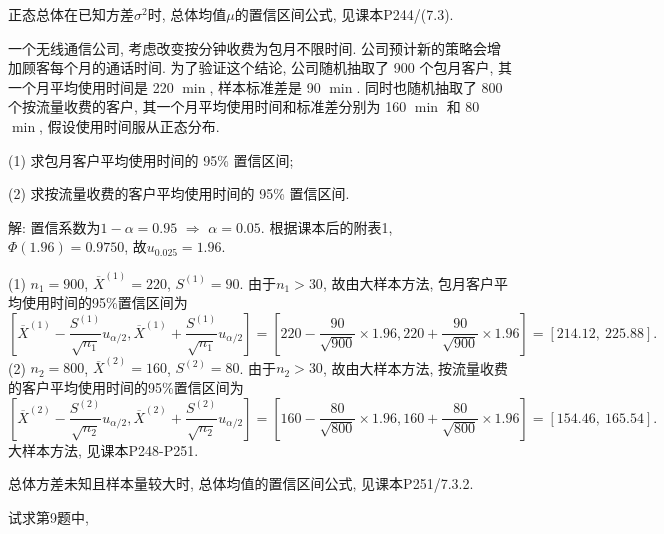 \documentclass[standard]{ExBook}
\renewenvironment{shaded}{%
  \def\FrameCommand{\fboxsep=\FrameSep \colorbox{shadecolor}}%
  \MakeFramed{\advance\hsize-\width \FrameRestore}%
}{%
  \endMakeFramed
}
\begin{document}
\begin{qitems}
\textcolor{themeColor}{\selectfont {}
正态总体在已知方差$\sigma^2$时, 总体均值$\mu$的置信区间公式, 见课本P244/(7.3).}

\vspace{2.5cm-5em}

    \begin{bbox}
    \begin{shaded}
        \qitem
一个无线通信公司, 考虑改变按分钟收费为包月不限时间. 公司预计新的策略会增加顾客每个月的通话时间. 为了验证这个结论, 公司随机抽取了 900 个包月客户, 其一个月平均使用时间是 220 $\min$, 样本标准差是 90 $\min$. 同时也随机抽取了 800 个按流量收费的客户, 其一个月平均使用时间和标准差分别为 160 $\min$ 和 80 $\min$, 假设使用时间服从正态分布.

(1) 求包月客户平均使用时间的 95\% 置信区间;

(2) 求按流量收费的客户平均使用时间的 95\% 置信区间.
    \end{shaded}
    \end{bbox}

\vspace{\dimexpr2.5cm-5em\relax}

解: 置信系数为$1-\alpha=0.95$ $\Longrightarrow$ $\alpha=0.05$. 根据课本后的附表1, $\Phi(1.96)=0.9750$, 故$u_{0.025}=1.96$.

(1) $n_1=900$, $\overline{X}^{(1)}=220$, $S^{(1)}=90$. 由于$n_1>30$, 故由大样本方法, 包月客户平均使用时间的95\%置信区间为
$$
\left[
\overline{X}^{(1)}-\frac{S^{(1)}}{\sqrt{n_1}}u_{\alpha/2},
\overline{X}^{(1)}+\frac{S^{(1)}}{\sqrt{n_1}}u_{\alpha/2}
\right]
=
\left[
220-\frac{90}{\sqrt{900}}\times1.96,
220+\frac{90}{\sqrt{900}}\times1.96
\right]
=[214.12,\ 225.88].
$$
(2) $n_2=800$, $\overline{X}^{(2)}=160$, $S^{(2)}=80$. 由于$n_2>30$, 故由大样本方法, 按流量收费的客户平均使用时间的95\%置信区间为
$$
\left[
\overline{X}^{(2)}-\frac{S^{(2)}}{\sqrt{n_2}}u_{\alpha/2},
\overline{X}^{(2)}+\frac{S^{(2)}}{\sqrt{n_2}}u_{\alpha/2}
\right]
=
\left[
160-\frac{80}{\sqrt{800}}\times1.96,
160+\frac{80}{\sqrt{800}}\times1.96
\right]
=[154.46,\ 165.54].
$$
\textcolor{themeColor}{\selectfont {} 大样本方法, 见课本P248-P251.}

\textcolor{themeColor}{\selectfont {} 
总体方差未知且样本量较大时, 总体均值的置信区间公式, 见课本P251/7.3.2.}

\vspace{2.5cm-5em}

    \begin{bbox}
    \begin{shaded}
        \qitem
试求第9题中,


\end{shaded}
\end{bbox}
\end{qitems}
\end{document}

